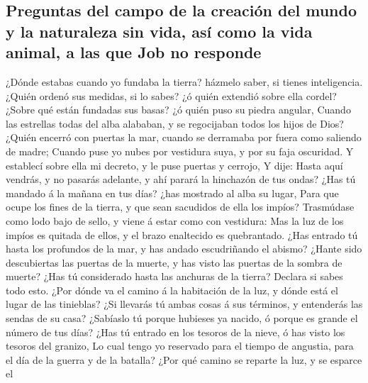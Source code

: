 \hypertarget{preguntas-del-campo-de-la-creaciuxf3n-del-mundo-y-la-naturaleza-sin-vida-asuxed-como-la-vida-animal-a-las-que-job-no-responde}{%
\subsection{Preguntas del campo de la creación del mundo y la naturaleza
sin vida, así como la vida animal, a las que Job no
responde}\label{preguntas-del-campo-de-la-creaciuxf3n-del-mundo-y-la-naturaleza-sin-vida-asuxed-como-la-vida-animal-a-las-que-job-no-responde}}

 ¿Dónde estabas cuando yo fundaba la tierra? házmelo
saber, si tienes inteligencia.  ¿Quién ordenó sus medidas,
si lo sabes? ¿ó quién extendió sobre ella cordel?  ¿Sobre
qué están fundadas sus basas? ¿ó quién puso su piedra angular,
 Cuando las estrellas todas del alba alababan, y se
regocijaban todos los hijos de Dios?  ¿Quién encerró con
puertas la mar, cuando se derramaba por fuera como saliendo de madre;
 Cuando puse yo nubes por vestidura suya, y por su faja
oscuridad.  Y establecí sobre ella mi decreto, y le puse
puertas y cerrojo,  Y dije: Hasta aquí vendrás, y no
pasarás adelante, y ahí parará la hinchazón de tus ondas?
 ¿Has tú mandado á la mañana en tus días? ¿has mostrado
al alba su lugar,  Para que ocupe los fines de la tierra,
y que sean sacudidos de ella los impíos?  Trasmúdase como
lodo bajo de sello, y viene á estar como con vestidura: 
Mas la luz de los impíos es quitada de ellos, y el brazo enaltecido es
quebrantado.  ¿Has entrado tú hasta los profundos de la
mar, y has andado escudriñando el abismo?  ¿Hante sido
descubiertas las puertas de la muerte, y has visto las puertas de la
sombra de muerte?  ¿Has tú considerado hasta las anchuras
de la tierra? Declara si sabes todo esto.  ¿Por dónde va
el camino á la habitación de la luz, y dónde está el lugar de las
tinieblas?  ¿Si llevarás tú ambas cosas á sus términos, y
entenderás las sendas de su casa?  ¿Sabíaslo tú porque
hubieses ya nacido, ó porque es grande el número de tus días?
 ¿Has tú entrado en los tesoros de la nieve, ó has visto
los tesoros del granizo,  Lo cual tengo yo reservado para
el tiempo de angustia, para el día de la guerra y de la batalla?
 ¿Por qué camino se reparte la luz, y se esparce el
